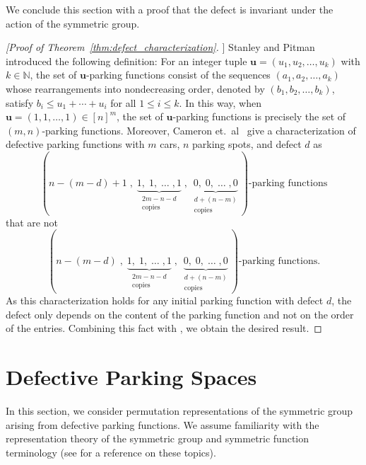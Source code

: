 \documentclass[11pt,reqno]{BICA}
\theoremstyle{definition}
\newcommand{\uu}{\textbf{u}}
\newcommand{\NN}{\mathbb{N}}
\begin{document}
We conclude this section with a proof that the defect is invariant under the action of the symmetric group.

\begin{proof}[[Proof of Theorem~\ref{thm:defect_characterization}]]
 Stanley and Pitman \cite{PitmanStanley} introduced the following definition: For an integer tuple $\textbf{u}=(u_1,u_2,\ldots,u_k)$ with $k\in\NN$, the set of $\textbf{u}$-parking functions consist of the sequences
$(a_1,a_2,\ldots,a_k)$ whose rearrangements into nondecreasing order, denoted by $(b_1,b_2,\ldots,b_k)$, satisfy $b_i \leq u_1+\cdots+u_i$ for all $1\leq i\leq k$. 
In this way, when $\uu=(1,1,\ldots,1)\in[n]^m$, the set of $\uu$-parking functions is precisely the set of $(m,n)$-parking functions. Moreover, Cameron et.~al~\cite[p.\ 3]{defective} 
give a characterization of defective parking functions with $m$ cars, $n$ parking spots, and defect $d$ as \[(n-(m-d)+1\;,\;\underbrace{1,\;1,\;\ldots\;,1}_{\begin{matrix}2m - n - d\\ \mbox{copies}\end{matrix}}\;,\;\underbrace{0,\;0,\;\ldots\;,0}_{\begin{matrix}d+(n-m)\\ \mbox{copies}\end{matrix}})\mbox{-parking functions}\] that are not \[(n-(m-d)\;,\;\underbrace{1,\;1,\;\ldots\;,1}_{\begin{matrix}2m - n - d\\ \mbox{copies}\end{matrix}}\;,\;\underbrace{0,\;0,\;\ldots\;,0}_{\begin{matrix}d+(n-m)\\\mbox{copies}\end{matrix}})\mbox{-parking functions.}\] As this characterization holds for any initial parking function with defect $d$, the defect only depends on the content of the parking function and not on the order of the entries. Combining this fact with , we obtain the desired result.
\end{proof}

\section{Defective Parking Spaces}\label{sec:rep theory}

In this section, we consider permutation representations of the symmetric group arising from defective parking functions. We assume familiarity with the representation theory of the symmetric group and symmetric function terminology (see \cite{Sagan} for a reference on these topics).
\end{document}
